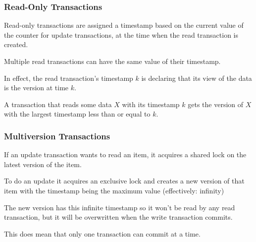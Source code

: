 \begin{frame}
\frametitle{Read-Only Transactions}
Read-only transactions are assigned a timestamp based on the current value of the counter for update transactions, at the time when the read transaction is created. 

Multiple read transactions can have the same value of their timestamp. 

In effect, the read transaction's timestamp $k$ is declaring that its view of the data is the version at time $k$. 

A transaction that reads some data $X$ with its timestamp $k$ gets the version of $X$ with the largest timestamp less than or equal to $k$. 

\end{frame}

\begin{frame}
\frametitle{Multiversion Transactions}
If an update transaction wants to read an item, it acquires a shared lock on the latest version of the item.

To do an update it acquires an exclusive lock and creates a new version of that item with the timestamp being the maximum value (effectively: infinity)

The new version has this infinite timestamp so it won't be read by any read transaction, but it will be overwritten when the write transaction commits.

This does mean that only one transaction can commit at a time.

\end{frame}

















